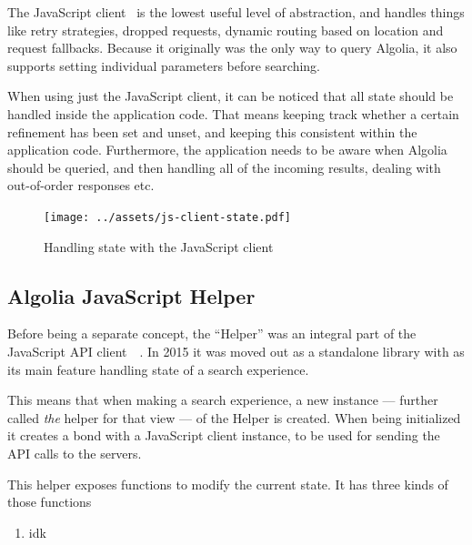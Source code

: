 The JavaScript client~\cite{algolia-js-client} is the lowest useful level of abstraction, and handles things like retry strategies, dropped requests, dynamic routing based on location and request fallbacks. Because it originally was the only way to query Algolia, it also supports setting individual parameters before searching.

When using just the JavaScript client, it can be noticed that all state should be handled inside the application code. That means keeping track whether a certain refinement has been set and unset, and keeping this consistent within the application code. Furthermore, the application needs to be aware when Algolia should be queried, and then handling all of the incoming results, dealing with out-of-order responses etc.

\begin{figure}[H]
\label{figure:js-client-state}
  \centering
  \texttt{[image: ../assets/js-client-state.pdf]}
  \caption{Handling state with the JavaScript client}
\end{figure}


\subsection{Algolia JavaScript Helper} %
\label{sub:algolia_js_helper}

Before being a separate concept, the ``Helper'' was an integral part of the JavaScript API client~\cite{algolia-blog-js-client}~. In 2015 it was moved out as a standalone library with as its main feature handling state of a search experience.

This means that when making a search experience, a new instance --- further called \emph{the} helper for that view --- of the Helper is created. When being initialized it creates a bond with a JavaScript client instance, to be used for sending the API calls to the servers.

This helper exposes functions to modify the current state. It has three kinds of those functions

\begin{enumerate}
  \item idk %
\end{enumerate}


